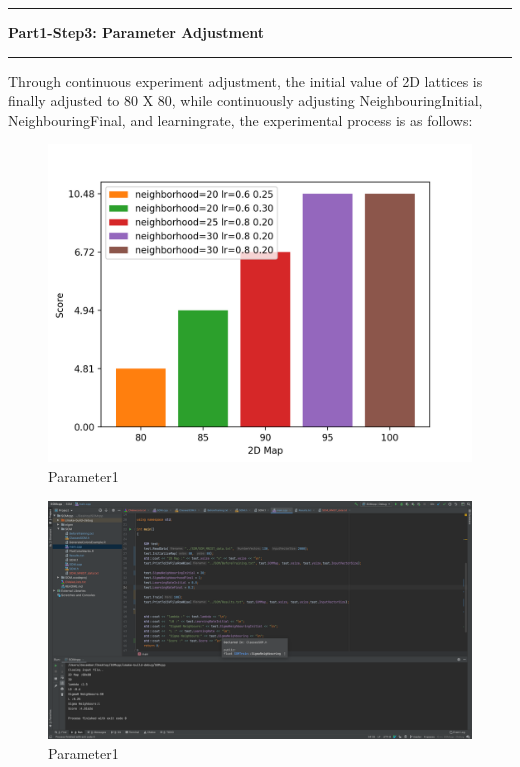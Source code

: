 \documentclass[11pt]{article}
\newcommand\question[2]{\vspace{.25in}\hrule\textbf{#1: #2}\vspace{.5em}\hrule\vspace{.10in}}
\begin{document}
\question{Part1-Step3}{Parameter Adjustment}
Through continuous experiment adjustment, the initial value of 2D lattices is finally adjusted to 80 X 80, while continuously adjusting NeighbouringInitial, NeighbouringFinal, and learningrate, the experimental process is as follows:

\begin{figure}[H]
    \centering
    \includegraphics[width=1\textwidth]{Figure_1}
    \caption{Parameter1}
\end{figure}

\begin{figure}[H]
    \centering
    \includegraphics[width=1\textwidth]{Fig1}
    \caption{Parameter1}
\end{figure}
\end{document}
